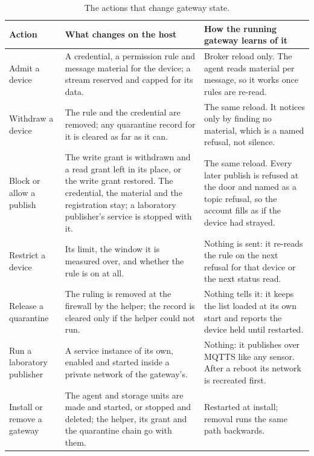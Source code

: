 \documentclass[12pt,a4paper]{report}
\begin{document}
\begin{table}[htbp]
\centering
{\small
\begin{tabularx}{\textwidth}{@{}p{3.0cm}Yp{4.8cm}@{}}
\toprule
\textbf{Action} & \textbf{What changes on the host}
    & \textbf{How the running gateway learns of it} \\
\midrule
Admit a device &
A credential, a permission rule and message material for the device; a
stream reserved and capped for its data. &
Broker reload only. The agent reads material per message, so it works
once rules are re-read. \\
\midrule
Withdraw a device &
The rule and the credential are removed; any quarantine record for it
is cleared as far as it can. &
The same reload. It notices only by finding no material, which is a
named refusal, not silence. \\
\midrule
Block or allow a publish &
The write grant is withdrawn and a read grant left in its place, or the
write grant restored. The credential, the material and the registration
stay; a laboratory publisher's service is stopped with it. &
The same reload. Every later publish is refused at the door and named as
a topic refusal, so the account fills as if the device had strayed. \\
\midrule
Restrict a device &
Its limit, the window it is measured over, and whether the rule is on
at all. &
Nothing is sent: it re-reads the rule on the next refusal for that
device or the next status read. \\
\midrule
Release a quarantine &
The ruling is removed at the firewall by the helper; the record is
cleared only if the helper could not run. &
Nothing tells it: it keeps the list loaded at its own start and reports
the device held until restarted. \\
\midrule
Run a laboratory publisher &
A service instance of its own, enabled and started inside a private
network of the gateway's. &
Nothing: it publishes over MQTTS like any sensor. After a reboot its
network is recreated first. \\
\midrule
Install or remove a gateway &
The agent and storage units are made and started, or stopped and
deleted; the helper, its grant and the quarantine chain go with them. &
Restarted at install; removal runs the same path backwards. \\
\bottomrule
\end{tabularx}}
\caption{The actions that change gateway state.}
\label{tab:gw-actions}
\end{table}
\end{document}
